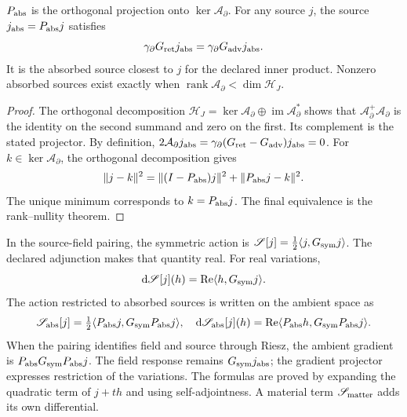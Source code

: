 \begin{theorem}
\label{vii:vii:thm:proyeccion-absorcion}
\(P_{\rm abs}\) is the orthogonal projection onto
\(\ker\mathcal A_\partial\). For any source \(j\), the source
\(j_{\rm abs}=P_{\rm abs}j\) satisfies
\begin{equation}
 \gamma_\partial G_{\rm ret}j_{\rm abs}
 =\gamma_\partial G_{\rm adv}j_{\rm abs}.
 \label{vii:vii:eq:igualdad-borde-absorbido}
\end{equation}
It is the absorbed source closest to \(j\) for the declared inner
product. Nonzero absorbed sources exist exactly when
\(\operatorname{rank}\mathcal A_\partial<\dim\mathcal H_J\).
\end{theorem}
\begin{proof}
The orthogonal decomposition
\(\mathcal H_J=\ker\mathcal A_\partial\oplus
 \operatorname{im}\mathcal A_\partial^*\) shows that
\(\mathcal A_\partial^+\mathcal A_\partial\) is the identity
on the second summand and zero on the first. Its complement is the
stated projector. By definition,
\(2\mathcal A_\partial j_{\rm abs}
 =\gamma_\partial(G_{\rm ret}-G_{\rm adv})j_{\rm abs}=0\).
For \(k\in\ker\mathcal A_\partial\), the orthogonal decomposition gives
\[
 \|j-k\|^2=\|(I-P_{\rm abs})j\|^2+\|P_{\rm abs}j-k\|^2.
\]
The unique minimum corresponds to \(k=P_{\rm abs}j\).
The final equivalence is the rank--nullity theorem.
\end{proof}

In the source-field pairing, the symmetric action is
\(\mathscr S[j]=\tfrac12\langle j,G_{\rm sym}j\rangle\).
The declared adjunction makes that quantity real. For real variations,
\[
 \mathrm d\mathscr S[j](h)
 =\operatorname{Re}\langle h,G_{\rm sym}j\rangle.
\]
The action restricted to absorbed sources is written on the ambient
space as
\begin{equation}
 \mathscr S_{\rm abs}[j]
 =\tfrac12\langle P_{\rm abs}j,G_{\rm sym}P_{\rm abs}j\rangle,
 \quad
 \mathrm d\mathscr S_{\rm abs}[j](h)
 =\operatorname{Re}\langle P_{\rm abs}h,G_{\rm sym}P_{\rm abs}j\rangle.
 \label{vii:vii:eq:variacion-restringida-absorcion}
\end{equation}
When the pairing identifies field and source through Riesz, the ambient gradient
is \(P_{\rm abs}G_{\rm sym}P_{\rm abs}j\).
The field response remains \(G_{\rm sym}j_{\rm abs}\); the
gradient projector expresses restriction of the variations.
The formulas are proved by expanding the quadratic term of
\(j+th\) and using self-adjointness. A material term
\(\mathscr S_{\rm matter}\) adds its own differential.

